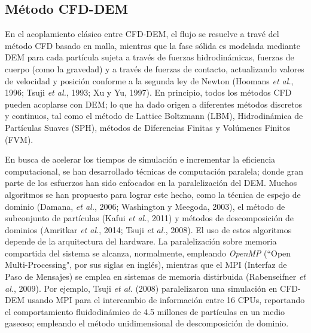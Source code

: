 \subsection{M\'etodo CFD-DEM} \label{MCFDEM}

\noindent
\justify

En el acoplamiento cl\'asico entre CFD-DEM, el flujo se resuelve a trav\'e del m\'etodo CFD basado en malla, mientras que la fase s\'olida es modelada mediante DEM para cada part\'icula sujeta a trav\'es de fuerzas hidrodin\'amicas, fuerzas de cuerpo (como la gravedad) y a trav\'es de fuerzas de contacto, actualizando valores de velocidad y posici\'on conforme a la segunda ley de Newton (Hoomans \textit{et al.}, 1996; Tsuji \textit{et al.}, 1993; Xu y Yu, 1997). En principio, todos los m\'etodos CFD pueden acoplarse con DEM; lo que ha dado origen a diferentes m\'etodos discretos y continuos, tal como el m\'etodo de Lattice Boltzmann (LBM), Hidrodin\'amica de Part\'iculas Suaves (SPH), m\'etodos de Diferencias Finitas y Vol\'umenes Finitos (FVM).

\noindent
\justify

 En busca de acelerar los tiempos de simulaci\'on e incrementar la eficiencia computacional, se han desarrollado t\'ecnicas de computaci\'on paralela; donde gran parte de los esfuerzos han sido enfocados en la paralelizaci\'on del DEM. Muchos algoritmos se han propuesto para lograr este hecho, como la t\'ecnica de espejo de dominio (Damana, \textit{et al.}, 2006; Washington y Meegoda, 2003), el m\'etodo de subconjunto de part\'iculas (Kafui \textit{et al.}, 2011) y m\'etodos de descomposici\'on de dominios (Amritkar \textit{et al.}, 2014; Tsuji \textit{et al.}, 2008). El uso de estos algoritmos depende de la arquitectura del hardware. La paralelizaci\'on sobre memoria compartida del sistema se alcanza, normalmente, empleando \textit{OpenMP} (``Open Multi-Processing", por sus siglas en ingl\'es), mientras que el MPI (Interfaz de Paso de Mensajes) se emplea en sistemas de memoria distirbuida (Rabenseifner \textit{et al.}, 2009). Por ejemplo, Tsuji \textit{et al.} (2008) paralelizaron una simulaci\'on en CFD-DEM usando MPI para el intercambio de informaci\'on entre 16 CPUs, reportando el comportamiento fluidodin\'amico de 4.5 millones de part\'iculas en un medio gaseoso; empleando el m\'etodo unidimensional de descomposici\'on de dominio.
 
\noindent
\justify

